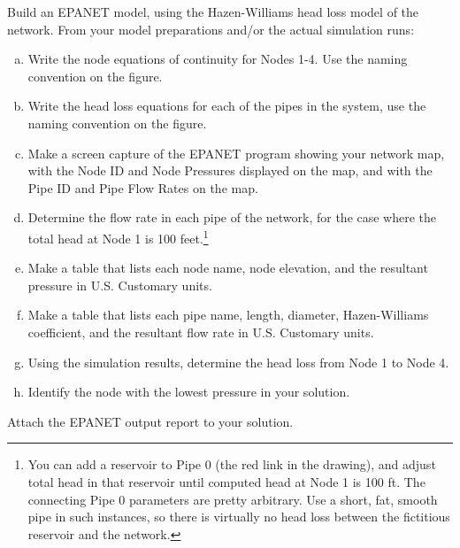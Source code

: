 \documentclass[12pt]{article}
\begin{document}
\begin{enumerate}
Build an EPANET model, using the Hazen-Williams head loss model of the network.  From your model preparations and/or the actual simulation runs:

\begin{enumerate}[a)]
\item Write the node equations of continuity for Nodes 1-4. Use the naming convention on the figure.
\item Write the head loss equations for each of the pipes in the system, use the naming convention on the figure.
\item  Make a screen capture of the EPANET program showing your network map, with the Node ID and Node Pressures displayed on the map, and with the Pipe ID and Pipe Flow Rates on the map.
\item Determine the flow rate in each pipe of the network, for the case where the total head at Node 1 is 100 feet.\footnote{You can add a reservoir to Pipe 0 (the red link in the drawing), and adjust total head in that reservoir until computed head at Node 1 is 100 ft.  The connecting Pipe 0 parameters are pretty arbitrary.  Use a short, fat, smooth pipe in such instances, so there is virtually no head loss between the fictitious reservoir and the network.}
\item Make a table that lists each node name, node elevation, and the resultant pressure in U.S. Customary units.
\item Make a table that lists each pipe name, length, diameter, Hazen-Williams coefficient, and the resultant flow rate in U.S. Customary units.
\item Using the simulation results, determine the head loss from Node 1 to Node 4.
\item Identify the node with the lowest pressure in your solution.
\end{enumerate}


Attach the EPANET output report to your solution.
\clearpage


\end{enumerate}
\end{document}

